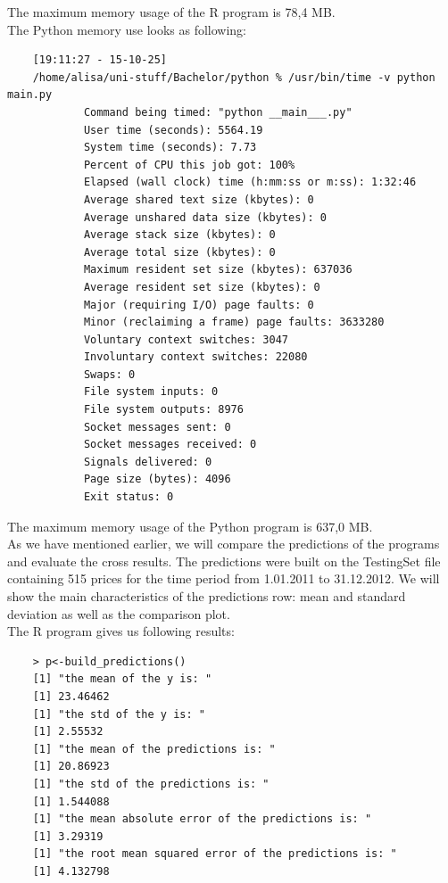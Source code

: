 \documentclass[
  twoside,
  11pt, a4paper,
  footinclude=true,
  headinclude=true,
  cleardoublepage=empty
]{scrreprt}
\begin{document}
    The maximum memory usage of the R program is 78,4 MB.\\
    The Python memory use looks as following:
    \begin{verbatim}
    [19:11:27 - 15-10-25] 
    /home/alisa/uni-stuff/Bachelor/python % /usr/bin/time -v python main.py
            Command being timed: "python __main___.py"
            User time (seconds): 5564.19
            System time (seconds): 7.73
            Percent of CPU this job got: 100%
            Elapsed (wall clock) time (h:mm:ss or m:ss): 1:32:46
            Average shared text size (kbytes): 0
            Average unshared data size (kbytes): 0
            Average stack size (kbytes): 0
            Average total size (kbytes): 0
            Maximum resident set size (kbytes): 637036
            Average resident set size (kbytes): 0
            Major (requiring I/O) page faults: 0
            Minor (reclaiming a frame) page faults: 3633280
            Voluntary context switches: 3047
            Involuntary context switches: 22080
            Swaps: 0
            File system inputs: 0
            File system outputs: 8976
            Socket messages sent: 0
            Socket messages received: 0
            Signals delivered: 0
            Page size (bytes): 4096
            Exit status: 0
    \end{verbatim}
    The maximum memory usage of the Python program is 637,0 MB.\\
    As we have mentioned earlier, we will compare the predictions of the programs and evaluate the cross results. The predictions were built on the TestingSet file containing 515 prices for the time period from 1.01.2011 to 31.12.2012. We will show the main characteristics of the predictions row: mean and standard deviation as well as the comparison plot.\\
    The R program gives us following results:
    \begin{verbatim}
    > p<-build_predictions()
    [1] "the mean of the y is: "
    [1] 23.46462
    [1] "the std of the y is: "
    [1] 2.55532
    [1] "the mean of the predictions is: "
    [1] 20.86923
    [1] "the std of the predictions is: "
    [1] 1.544088
    [1] "the mean absolute error of the predictions is: "
    [1] 3.29319
    [1] "the root mean squared error of the predictions is: "
    [1] 4.132798
    \end{verbatim}
    
\end{document}
